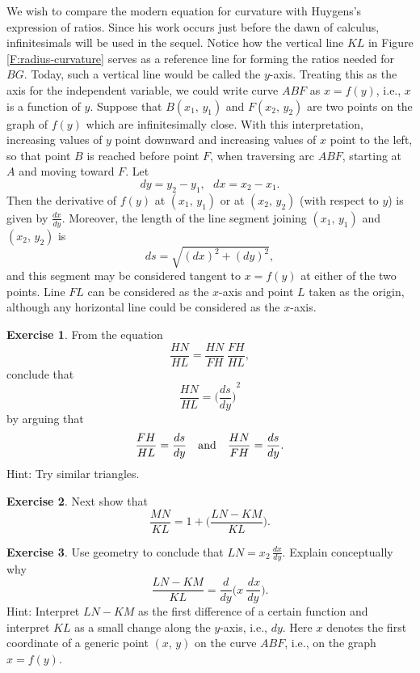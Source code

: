 \documentclass[12pt]{article}
\theoremstyle{definition}
\newtheorem{exercise}{Exercise}[section]
\begin{document}
We wish to compare the modern equation for curvature with Huygens's 
expression of ratios.  Since his work occurs just before the dawn
of calculus, infinitesimals will be used in the sequel.  
Notice how the vertical line $KL$ in Figure \ref{F:radius-curvature}
serves as a reference line for forming the ratios needed for $BG$.
Today, such a vertical line would be called the $y$-axis.  Treating
this as the axis for the independent variable, we could write curve
$ABF$ as $x = f(y)$, i.e., $x$ is a function of $y$.
Suppose that $B(x_1, \, y_1)$ and $F(x_2, \, y_2)$ 
are two points on the graph of $f(y)$ which are infinitesimally
close.  With this interpretation, increasing values of $y$ point
downward and increasing values of $x$ point to the left, so that
point $B$ is reached before point $F$, when traversing arc $ABF$,
starting at $A$ and moving toward $F$.   
Let  $$  d y = y_2 - y_1, \ \ \ d  x = x_2 - x_1 .  $$
Then the derivative of $f(y)$ at $(x_1, \, y_1)$ or at $(x_2, \, y_2)$
(with respect to $y$) is given by $\frac{d  x}{d  y}$.  
Moreover, the length of the line
segment joining $(x_1, \, y_1)$ and $(x_2, \, y_2)$ is
$$  d s = \sqrt{(d x)^2 + (d y)^2},  $$
and this segment may be considered tangent to $x = f(y)$ at either of
the two points.  Line $FL$ can be considered as the $x$-axis and point
$L$ taken as the origin, although any horizontal line could be
considered as the $x$-axis.

\begin{exercise}  \label{E:dy/ds}
From the equation
$$  \frac{HN}{HL} = \frac{HN}{FH} \, \frac{FH}{HL},  $$
conclude that
$$  \frac{HN}{HL} = {\Big( \frac{d s}{d y}\Big)}^2  $$
by arguing that
$$  \frac{FH}{HL} = \frac{d s}{d y} \ \ \ {\rm{and}} \ \ \
\frac{HN}{FH} = \frac{d s}{d y}.  $$
Hint:  Try similar triangles.
\end{exercise}

\begin{exercise}  \label{E:1-plus}
Next show that
$$  \frac{MN}{KL} = 1 + \Big( \frac{LN - KM}{KL} \Big).  $$
\end{exercise}

\begin{exercise}  \label{E:conceptual}
Use geometry to conclude that $LN = x_2 \, \frac{d x}{d y}$.
Explain conceptually why
$$  \frac{LN - KM}{KL} = \frac{d \! }{d y}
\Big(x \, \frac{\, d x}{d y}\Big ). $$
Hint:  Interpret $LN -KM$ as the first difference of a certain
function and interpret $KL$ as a small change along the $y$-axis,
i.e., $dy$.  Here $x$ denotes the first coordinate of a generic point 
$(x, \, y)$ on the curve $ABF$, i.e., on the graph $x = f(y)$.
\end{exercise}
\end{document}
